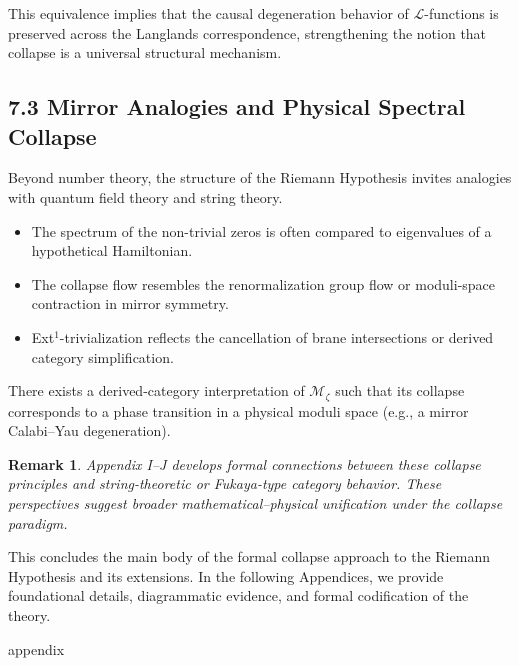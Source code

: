 \documentclass[11pt]{article}
\newtheorem{remark}[theorem]{Remark}
\begin{document}
This equivalence implies that the causal degeneration behavior of $\mathcal{L}$-functions is preserved across the Langlands correspondence,  
strengthening the notion that collapse is a universal structural mechanism.

\subsection{7.3 Mirror Analogies and Physical Spectral Collapse}

Beyond number theory, the structure of the Riemann Hypothesis invites analogies with quantum field theory and string theory.

\begin{itemize}
    \item The spectrum of the non-trivial zeros is often compared to eigenvalues of a hypothetical Hamiltonian.
    \item The collapse flow resembles the renormalization group flow or moduli-space contraction in mirror symmetry.
    \item Ext$^1$-trivialization reflects the cancellation of brane intersections or derived category simplification.
\end{itemize}

\begin{conjecture}
There exists a derived-category interpretation of $\mathcal{M}_\zeta$ such that its collapse corresponds to a phase transition in a physical moduli space  
(e.g., a mirror Calabi–Yau degeneration).
\end{conjecture}

\begin{remark}
Appendix I–J develops formal connections between these collapse principles and string-theoretic or Fukaya-type category behavior.  
These perspectives suggest broader mathematical–physical unification under the collapse paradigm.
\end{remark}

This concludes the main body of the formal collapse approach to the Riemann Hypothesis and its extensions.  
In the following Appendices, we provide foundational details, diagrammatic evidence, and formal codification of the theory.




appendix
\end{document}
